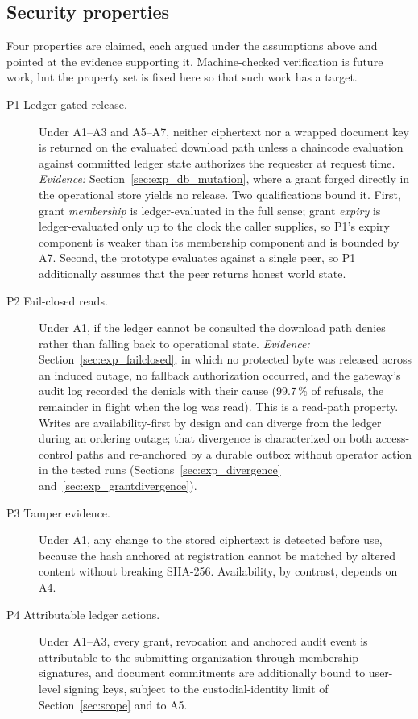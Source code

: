 \documentclass[preprint,12pt]{elsarticle}
\begin{document}
\subsection{Security properties}
\label{sec:security_properties}

Four properties are claimed, each argued under the assumptions above and pointed
at the evidence supporting it. Machine-checked verification is future work, but
the property set is fixed here so that such work has a target.

\begin{description}
\item[P1 Ledger-gated release.] Under A1--A3 and A5--A7, neither ciphertext nor
a wrapped document key is returned on the evaluated download path unless a
chaincode evaluation against committed ledger state authorizes the requester at
request time. \emph{Evidence:} Section~\ref{sec:exp_db_mutation}, where a grant
forged directly in the operational store yields no release. Two qualifications
bound it. First, grant \emph{membership} is ledger-evaluated in the full sense;
grant \emph{expiry} is ledger-evaluated only up to the clock the caller
supplies, so P1's expiry component is weaker than its membership component and
is bounded by A7. Second, the prototype evaluates against a single peer, so P1
additionally assumes that the peer returns honest world state.

\item[P2 Fail-closed reads.] Under A1, if the ledger cannot be consulted the
download path denies rather than falling back to operational state.
\emph{Evidence:} Section~\ref{sec:exp_failclosed}, in which no protected
byte was released across an induced outage, no fallback authorization occurred,
and the gateway's audit log recorded the denials with their cause (99.7\,\% of
refusals, the remainder in flight when the log was read). This is a read-path property. Writes are availability-first by
design and can diverge from the ledger during an ordering outage; that divergence
is characterized on both access-control paths and re-anchored by a durable outbox
without operator action in the tested runs
(Sections~\ref{sec:exp_divergence} and~\ref{sec:exp_grantdivergence}).

\item[P3 Tamper evidence.] Under A1, any change to the stored ciphertext is
detected before use, because the hash anchored at registration cannot be
matched by altered content without breaking SHA-256. Availability, by contrast,
depends on A4.

\item[P4 Attributable ledger actions.] Under A1--A3, every grant, revocation and
anchored audit event is attributable to the submitting organization through
membership signatures, and document commitments are additionally bound to
user-level signing keys, subject to the custodial-identity limit of
Section~\ref{sec:scope} and to A5.
\end{description}
\end{document}
